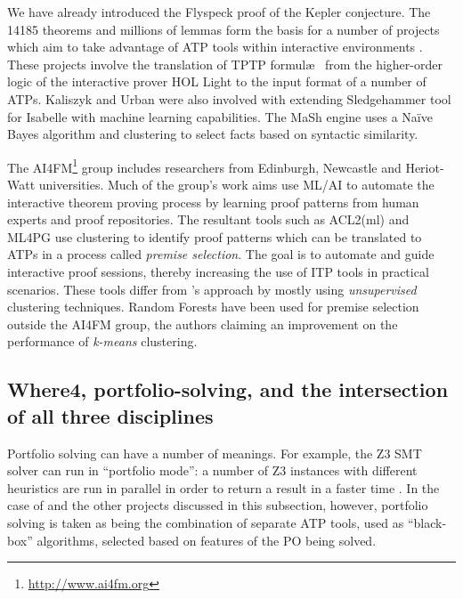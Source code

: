 We have already introduced the Flyspeck \cite{hales-kepler} proof of the Kepler conjecture. The 14185 theorems and millions of lemmas form the basis for a number of projects which aim to take advantage of ATP tools within interactive environments \cite{Flyspec, Kaliszyk2015109}. These projects involve the translation of TPTP formul\ae~  from the higher-order logic of the  interactive prover \textsf{HOL Light} to the input format of a number of ATPs. Kaliszyk and Urban were also involved with extending Sledgehammer \cite{threeyears} tool for Isabelle \cite{Isabelle} with machine learning capabilities. The MaSh \cite{Sledgehammer} engine uses a Na{\"i}ve Bayes algorithm and clustering to select facts based on syntactic similarity.       

The AI4FM\footnote{\url{http://www.ai4fm.org}} group includes researchers from Edinburgh, Newcastle and Heriot-Watt universities. Much of the group's work \cite{Heras2013, ML4PG, bundy_et_al:DR:2012:3731} aims use ML/AI to automate the interactive theorem proving process by learning proof patterns from human experts and proof repositories. The resultant tools such as ACL2(ml) \cite{Heras2013} and ML4PG \cite{ML4PG} use clustering to identify proof patterns which can be translated to ATPs in a process called \textit{premise selection}. The goal is to automate and guide interactive proof sessions, thereby increasing the use of ITP tools in practical scenarios. These tools differ from \where's approach by mostly using \textit{unsupervised} clustering techniques. Random Forests have been used for premise selection \cite{Farber2015} outside the AI4FM group, the authors claiming an improvement on the performance of \textit{k-means} clustering. 

\subsection{Where4, portfolio-solving, and the intersection of all three disciplines}
\label{sub:lrsvmmml}

Portfolio solving can have a number of meanings. For example, the Z3 SMT solver can run in ``portfolio mode'': a number of Z3 instances with different heuristics are run in parallel in order to return a result in a faster time \cite{WintersteigerHM09}. In the case of \where and the other projects discussed in this subsection, however, portfolio solving is taken as being the combination of separate ATP tools, used as ``black-box'' algorithms, selected based on features of the PO being solved.

